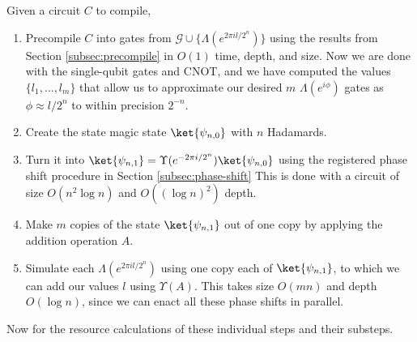 Given a circuit $C$ to compile,

\begin{enumerate}
\item Precompile $C$ into gates from $\mathcal{G} \cup \{\Lambda(e^{2\pi i l / 2^n})\}$
using the results from Section \ref{subsec:precompile} in $O(1)$ time, depth,
and size.
Now we are done with the single-qubit gates and CNOT, and we have computed
the values $\{l_1, \ldots , l_m\}$ that allow us to approximate our
desired $m$
$\Lambda(e^{i\phi})$ gates as $\phi \approx l/2^n$ to within precision
$2^{-n}$.
\item Create the state magic state $\ket{\psi_{n,0}}$ with $n$ Hadamards.
\item Turn it into $\ket{\psi_{n,1}} = \Upsilon(e^{-2\pi i / 2^n}) \ket{\psi_{n,0}}$
using the registered phase shift procedure in Section \ref{subsec:phase-shift}
This is done with a circuit of size $O(n^2\log n)$ and $O((\log n)^2)$ depth.
\item Make $m$ copies of the state $\ket{\psi_{n,1}}$ out of one copy by 
applying the addition operation $A$.
\item Simulate each $\Lambda(e^{2\pi i l / 2^n})$
using one copy each of $\ket{\psi_{n,1}}$, to which we can add our
values $l$ using $\Upsilon(A)$.
This takes size $O(mn)$ and depth $O(\log n)$, since we can enact
all these phase shifts in parallel.
\end{enumerate}

Now for the resource calculations of these individual steps and their
substeps.













